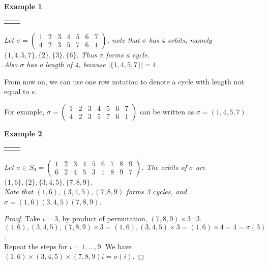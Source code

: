 \documentclass{article}
\theoremstyle{MyNonumberplain}
\theoremstyle{break}
\newtheorem*{proof}{Proof. }
\newcommand{\nline}{\begin{tabular}{ll}&\\\end{tabular}}
\theoremstyle{break}
\newtheorem{example}{Example}[section]
\theoremstyle{break}
\theoremstyle{definition}
\theoremstyle{break}
\begin{document}
\begin{expbox}
    \begin{example}

        \nline

        Let $\sigma = \left(\begin{array}{ccccccc}
            1 & 2 & 3 & 4 & 5 & 6 & 7\\
            4 & 2 & 3 & 5 & 7 & 6 & 1
          \end{array}\right)$, note that $\sigma$ has $4$ orbits, namely $\{ 1, 4, 5, 7
          \}, \{ 2 \}, \{ 3 \}, \{ 6 \}$. Thus $\sigma$ forms a cycle.\\
          
          Also $\sigma$ has a length of 4, because $| \{ 1, 4, 5, 7 \} | = 4$
    \end{example}
\end{expbox}

From now on, we can use one row notation to denote a cycle with length not
equal to $e$.

For example, $\sigma = \left(\begin{array}{ccccccc}
  1 & 2 & 3 & 4 & 5 & 6 & 7\\
  4 & 2 & 3 & 5 & 7 & 6 & 1
\end{array}\right)$ can be written as $\sigma = (1, 4, 5, 7)$. 


\begin{expbox}
    \begin{example}

        \nline

        Let $\sigma \in S_9 = \left(\begin{array}{ccccccccc}
            1 & 2 & 3 & 4 & 5 & 6 & 7 & 8 & 9\\
            6 & 2 & 4 & 5 & 3 & 1 & 8 & 9 & 7
          \end{array}\right)$. The orbits of $\sigma$ are $\{ 1, 6 \}, \{ 2 \}, \{ 3, 4,
          5 \}, \{ 7, 8, 9 \}$.\\
          
          Note that $(1, 6), (3, 4, 5), (7, 8, 9)$ forms 3 cycles, and $\sigma = (1, 6)
          (3, 4, 5)(7, 8, 9)$.
    \end{example}
    \begin{prfbox}
        \begin{proof}
            Take $i = 3$, by product of permutation, $(7, 8, 9) \times 3$=3.\\

            $(1, 6), (3, 4, 5), (7, 8, 9) \times 3 = (1, 6), (3, 4, 5) \times 3 = (1, 6)
            \times 4 = 4 = \sigma (3)$.\\

            Repeat the steps for $i = 1, \ldots, 9$. We have $(1, 6) \times (3, 4, 5) \times
            (7, 8, 9) i = \sigma (i)$.
        \end{proof}
    \end{prfbox}
\end{expbox}
\end{document}
